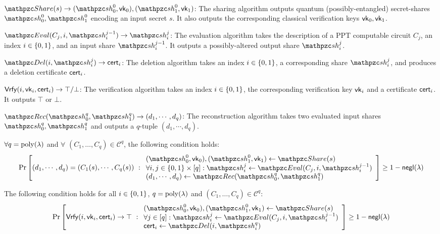 \begin{description}

\item [Syntax:] $ $
\item $\Sh(s) \rightarrow (\qsh_0^0, \vk_0), (\qsh_1^0,
\vk_1)$: The sharing algorithm outputs quantum
(possibly-entangled) secret-shares $\qsh_0^0, \qsh_1^0$ encoding an
input secret $s$. It also outputs the corresponding classical
verification keys $\mathsf{vk}_0, \mathsf{vk}_1$.

\item $\Ev(C_j, i, \qsh_i^{j-1}) \rightarrow \qsh_i^{j}$: The
evaluation algorithm takes the description of a PPT computable
circuit $C_j$, an index $i \in \{0,1\}$, and an input share
$\qsh_i^{j-1}$. It outputs a possibly-altered output share
$\qsh_i^{j}$.

\item $\Del(i, \qsh_i^j) \rightarrow \cert_i$: The deletion
algorithm takes an index $i \in \{0,1\}$, a corresponding share
$\qsh_i^j$, and produces a deletion certificate $\mathsf{cert}_i$.

\item $\mathsf{Vrfy}(i, \mathsf{vk}_i, \mathsf{cert}_i) \rightarrow \top/\bot$: The
verification algorithm takes an index $i \in \{0,1\}$, the
corresponding verification key $\mathsf{vk}_i$ and a certificate $\mathsf{cert}_i$.
It outputs $\top$ or $\bot$.

\item $\Rec(\qsh_0^q, \qsh_1^q) \rightarrow (d_1, \cdots, d_q)$: The
reconstruction algorithm takes two evaluated input shares $\qsh_0^q,
\qsh_1^q$ and outputs a $q$-tuple $(d_1, \cdots, d_q)$.

\item [Evaluation Correctness:] $\forall q = {\mathrm{poly}}(\lambda)$
and $\forall$ $(C_1, \ldots, C_q) \in \mathcal{C}^{q}$, the
following condition holds:
\begin{align}
\Pr\left[
(d_1, \cdots, d_q) = (C_1(s), \cdots, C_q(s))
\ :
\begin{array}{ll}
(\qsh_0^0, \vk_0), (\qsh_1^0, \vk_1) \gets \Sh(s)\\
\forall i,j \in \bit \times [q]: \qsh_i^j \leftarrow \Ev(C_j, i,
\qsh_i^{j-1})\\
(d_1, \cdots, d_q) \leftarrow \Rec(\qsh_0^q, \qsh_1^q)
\end{array}
\right] \geq 1 - \negl(\secp)
\end{align}

\item [Deletion Correctness:] The following condition holds for
all $i \in \{0,1\}$, $q = {\mathrm{poly}}(\lambda)$ and $(C_1, \ldots, C_q) \in
\mathcal{C}^q:$
\begin{align}
\Pr\left[
\Vrfy(i, \vk_i, \cert_i) \rightarrow \top
\ :
\begin{array}{ll}
(\qsh_0^0, \vk_0), (\qsh_1^0, \vk_1) \gets \Sh(s)\\
\forall j \in [q]: \qsh_i^j \leftarrow \Ev(C_j, i,
\qsh_i^{j-1})\\
\cert_i \leftarrow \Del(i, \qsh_i^q)
\end{array}
\right] \geq 1 - \negl(\secp)
\end{align}


\end{description}
